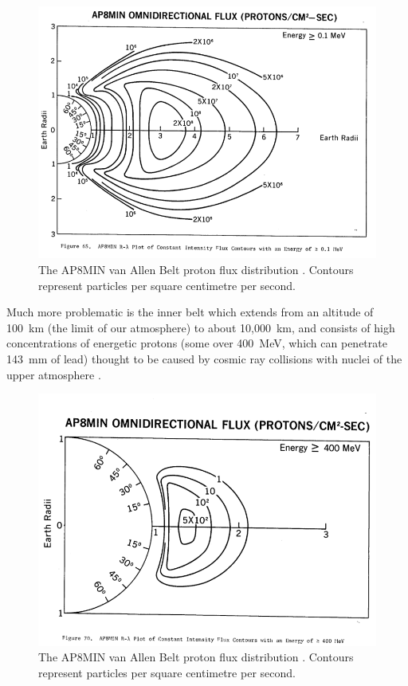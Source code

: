 \begin{figure} 
\caption{The AP8MIN van Allen Belt proton flux distribution \parencite{Sawyer1976}. Contours represent particles per square centimetre per second.} \label{fig:vabs2}
\includegraphics[width=\textwidth,clip,trim=0 35 0 30]{Images/800px-Ap8-omni-0_100MeV.png}
\end{figure}

Much more problematic is the inner belt which extends from an altitude of 100~km (the limit of our atmosphere) to about 10,000~km, and consists of high concentrations of energetic protons (some over 400~MeV, which can penetrate 143~mm of lead) thought to be caused by cosmic ray collisions with nuclei of the upper atmosphere \parencite{Hess1968}.

\begin{figure} 
\caption{The AP8MIN van Allen Belt proton flux distribution \parencite{Sawyer1976}. Contours represent particles per square centimetre per second.} \label{fig:vabs3}
\includegraphics[width=\textwidth,clip,trim=0 35 0 67]{Images/800px-Ap8-omni-400_0MeV.png}
\end{figure}

